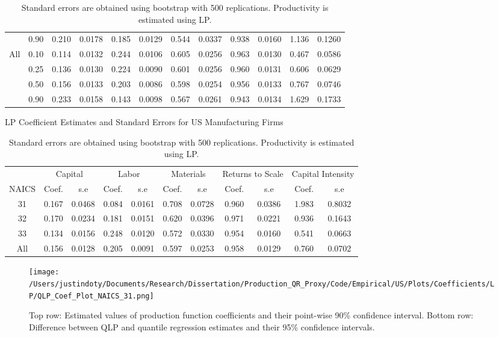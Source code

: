 \documentclass[11pt]{article}
\begin{document}
\begin{table}[H]
\begin{tabular}{cccccccccccc}
   & 0.90 & 0.210 & 0.0178 & 0.185 & 0.0129 & 0.544 & 0.0337 & 0.938 & 0.0160 & 1.136 & 0.1260 \\ 
  All & 0.10 & 0.114 & 0.0132 & 0.244 & 0.0106 & 0.605 & 0.0256 & 0.963 & 0.0130 & 0.467 & 0.0586 \\ 
   & 0.25 & 0.136 & 0.0130 & 0.224 & 0.0090 & 0.601 & 0.0256 & 0.960 & 0.0131 & 0.606 & 0.0629 \\ 
   & 0.50 & 0.156 & 0.0133 & 0.203 & 0.0086 & 0.598 & 0.0254 & 0.956 & 0.0133 & 0.767 & 0.0746 \\ 
   & 0.90 & 0.233 & 0.0158 & 0.143 & 0.0098 & 0.567 & 0.0261 & 0.943 & 0.0134 & 1.629 & 0.1733 \\ 
   \hline
\end{tabular}
\caption*{\footnotesize Standard errors are obtained using bootstrap with 500 replications. Productivity is estimated using LP.}
\end{table}

\begin{table}[H]
\centering
\caption{LP Coefficient Estimates and Standard Errors for US Manufacturing Firms}
\begin{tabular}{ccccccccccc}
  \hline\hline & \multicolumn{2}{c}{Capital} & \multicolumn{2}{c}{Labor} & \multicolumn{2}{c}{Materials} & \multicolumn{2}{c}{Returns to Scale} & \multicolumn{2}{c}{Capital Intensity}\\ \cmidrule(lr){2-3} \cmidrule(lr){4-5} \cmidrule(lr){6-7} \cmidrule(lr){8-9} \cmidrule(lr){10-11}NAICS & Coef. & s.e & Coef. & s.e & Coef. & s.e & Coef. & s.e & Coef. & s.e \\ 
  \hline
31 & 0.167 & 0.0468 & 0.084 & 0.0161 & 0.708 & 0.0728 & 0.960 & 0.0386 & 1.983 & 0.8032 \\ 
  32 & 0.170 & 0.0234 & 0.181 & 0.0151 & 0.620 & 0.0396 & 0.971 & 0.0221 & 0.936 & 0.1643 \\ 
  33 & 0.134 & 0.0156 & 0.248 & 0.0120 & 0.572 & 0.0330 & 0.954 & 0.0160 & 0.541 & 0.0663 \\ 
  All & 0.156 & 0.0128 & 0.205 & 0.0091 & 0.597 & 0.0253 & 0.958 & 0.0129 & 0.760 & 0.0702 \\ 
   \hline
\end{tabular}
\caption*{\footnotesize Standard errors are obtained using bootstrap with 500 replications. Productivity is estimated using LP.}
\end{table}

\begin{figure}[H]
\centering
\texttt{[image: /Users/justindoty/Documents/Research/Dissertation/Production\_QR\_Proxy/Code/Empirical/US/Plots/Coefficients/LP/QLP\_Coef\_Plot\_NAICS\_31.png]}
\caption{Top row: Estimated values of production function coefficients and their point-wise 90\% confidence interval. Bottom row: Difference between QLP and quantile regression estimates and their 95\% confidence intervals.}
\label{fig:31coef}
\end{figure}
\end{document}
